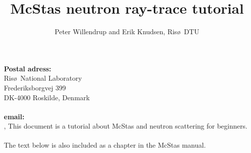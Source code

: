 \documentclass[a4paper]{article}
\title{McStas neutron ray-trace tutorial}
\author{Peter Willendrup and Erik Knudsen, Ris\o\ DTU}
\begin{document}
\maketitle
{\noindent \small {\bf Postal adress:}\\
Ris\o\ National Laboratory\\Frederiksborgvej 399\\DK-4000
  Roskilde, Denmark\\\ \\{\bf
    email:}\\,}
\abstract \noindent This document is a tutorial about McStas and
neutron scattering for beginners.\\\ 
\\The text below is also included as a chapter in the McStas manual.

\end{document}
